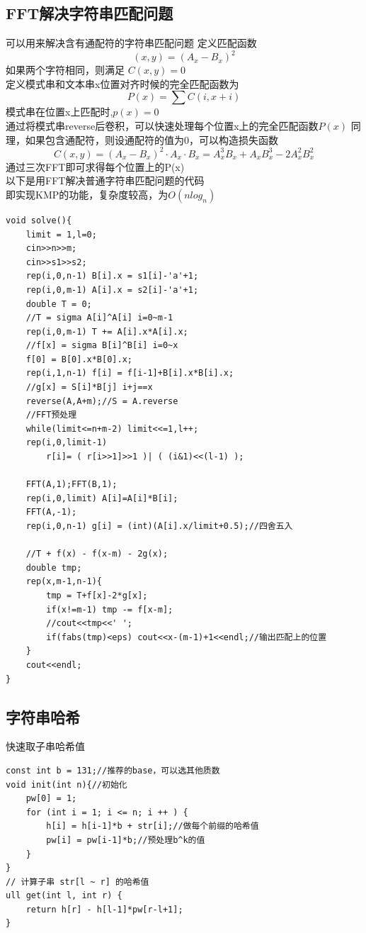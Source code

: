 \documentclass[a4]{ctexart}
\begin{document}
\subsection{FFT解决字符串匹配问题}
可以用来解决含有通配符的字符串匹配问题
定义匹配函数 $$(x,y) = (A_x-B_x)^2$$
如果两个字符相同，则满足 $C(x,y)=0$\\
定义模式串和文本串x位置对齐时候的完全匹配函数为
$$P(x)=\sum C(i,x+i)$$
模式串在位置x上匹配时,$p(x)=0$\\
通过将模式串reverse后卷积，可以快速处理每个位置x上的完全匹配函数$P(x)$
同理，如果包含通配符，则设通配符的值为0，可以构造损失函数
$$C(x,y)=(A_x-B_x)^2 \cdot A_x \cdot B_x=A_x^3 B_x+A_xB_x^3-2A_x^2B_x^2$$
通过三次FFT即可求得每个位置上的P(x)\\
以下是用FFT解决普通字符串匹配问题的代码\\
即实现KMP的功能，复杂度较高，为$O(nlog_n)$\\
\begin{lstlisting}
void solve(){
    limit = 1,l=0;
    cin>>n>>m;
    cin>>s1>>s2;
    rep(i,0,n-1) B[i].x = s1[i]-'a'+1;
    rep(i,0,m-1) A[i].x = s2[i]-'a'+1;
    double T = 0;
    //T = sigma A[i]^A[i] i=0~m-1
    rep(i,0,m-1) T += A[i].x*A[i].x;
    //f[x] = sigma B[i]^B[i] i=0~x
    f[0] = B[0].x*B[0].x;
    rep(i,1,n-1) f[i] = f[i-1]+B[i].x*B[i].x;
    //g[x] = S[i]*B[j] i+j==x
    reverse(A,A+m);//S = A.reverse
    //FFT预处理
    while(limit<=n+m-2) limit<<=1,l++;
    rep(i,0,limit-1)
        r[i]= ( r[i>>1]>>1 )| ( (i&1)<<(l-1) );
    
    FFT(A,1);FFT(B,1);
    rep(i,0,limit) A[i]=A[i]*B[i];
    FFT(A,-1);
    rep(i,0,n-1) g[i] = (int)(A[i].x/limit+0.5);//四舍五入
    
    //T + f(x) - f(x-m) - 2g(x);
    double tmp;
    rep(x,m-1,n-1){
        tmp = T+f[x]-2*g[x];
        if(x!=m-1) tmp -= f[x-m];
        //cout<<tmp<<' ';
        if(fabs(tmp)<eps) cout<<x-(m-1)+1<<endl;//输出匹配上的位置
    }
    cout<<endl;
}
\end{lstlisting}

\subsection{字符串哈希}
快速取子串哈希值
\begin{lstlisting}
const int b = 131;//推荐的base，可以选其他质数
void init(int n){//初始化 
    pw[0] = 1;
    for (int i = 1; i <= n; i ++ ) {
        h[i] = h[i-1]*b + str[i];//做每个前缀的哈希值 
        pw[i] = pw[i-1]*b;//预处理b^k的值 
    }
}
// 计算子串 str[l ~ r] 的哈希值
ull get(int l, int r) {
    return h[r] - h[l-1]*pw[r-l+1];
}
\end{lstlisting}
\end{document}
